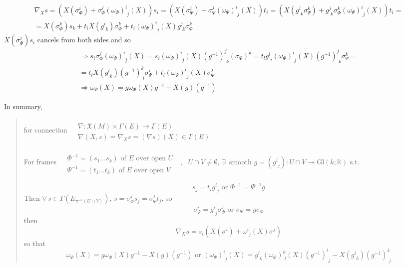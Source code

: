\documentclass[10pt]{amsart}
\begin{document}
\begin{multicols*}{2}
\[
\begin{gathered}
  \nabla_X s = (X(\sigma^i_{\Phi})+\sigma^j_{\Phi}(\omega_{\Phi})^i_{ \,\, j}(X) ) s_i = (X(\sigma^i_{\Psi}) + \sigma^j_{\Psi} (\omega_{\Psi})^i_{ \, \, j}(X) )t_i = (X(g^i_{ \,\, k} \sigma^k_{\Psi} ) + g^j_{ \,\,k} \sigma_{\Phi}^k (\omega_{\Psi})^i_{ \,\, j}(X))t_i = \\
  = X(\sigma^k_{\Phi})s_k + t_i X(g^i_{ \,\, k} ) \sigma^k_{\Phi} + t_i (\omega_{\Psi})^i_{ \,\, j}(X) g^j_{ \,\, k} \sigma^k_{\Phi} 
\end{gathered}
\]
$X(\sigma^j_{\Phi})s_i$ cancels from both sides and so
\[
\begin{gathered}
  \Longrightarrow s_i \sigma^j_{\Phi} (\omega_{\Phi})^i_{ \,\, j}(X) = s_i (\omega_{\Phi})^i_{ \,\, j}(X) (g^{-1})^j_{ \,\, k} (\sigma_{\Psi})^k = t_l g^l_{\,\, i} (\omega_{\Phi})^i_{ \,\, j}(X) (g^{-1})^j_{\,\,k} \sigma^k_{\Psi} = \\
  = t_l X(g^l_{ \,\, k})(g^{-1})^k_{ \,\, i} \sigma^i_{\Psi} + t_l (\omega_{\Psi})^l_{ \,\, j}(X) \sigma^j_{\Psi}  \\
  \Longrightarrow \omega_{\Psi}(X) = g\omega_{\Phi}(X)g^{-1} - X(g)(g^{-1})
\end{gathered}
\]

In summary, 
\begin{quote}
for connection $\begin{aligned} & \quad \\
  & \nabla : \mathfrak{X}(M) \times \Gamma(E) \to \Gamma(E) \\
  & \nabla(X,s) = \nabla_Xs = (\nabla s)(X) \in \Gamma(E) \end{aligned}$

For frames $\begin{aligned} & \quad \\
  & \Phi^{-1} = (s_1 \dots s_k) \text{ of $E$ over open $U$ } \\
  & \Psi^{-1} = (t_1 \dots t_k) \text{ of $E$ over open $V$ } 
\end{aligned}$, \, $U\cap V \neq \emptyset$, $\exists \, $ smooth $g = (g^i_{ \,\, j} ):U \cap V \to \text{Gl}(k;\mathbb{K})$ s.t. 

\[
s_j = t_i g^i_{ \,\, j} \text{ or } \Phi^{-1} = \Psi^{-1}g 
\]
Then $\forall \, s \in \Gamma(E_{\pi^{-1}(U\cap V) })$, $s = \sigma^j_{\Phi}s_j = \sigma^j_{\Psi} t_j$, so 
\[
\sigma^i_{\Psi} = g^i_{  \, \, j} \sigma^j_{\Phi} \text{ or } \sigma_{\Psi} = g\sigma_{\Phi}
\]
then
\[
\nabla_X s = s_i(X(\sigma^i) + \omega^i_{ \,\, j}(X)\sigma^j) 
\]
so that 
\begin{equation}
\boxed{ \omega_{\Psi}(X) = g\omega_{\Phi}(X)g^{-1} - X(g)(g^{-1}) \text{ or } (\omega_{\Psi})^i_{\, \, j}(X) = g^i_{ \,\, k} (\omega_{\Phi})^k_{ \,\, l }(X) (g^{-1})^l_{ \,\, j} - X(g^i_{ \,\, k})(g^{-1})^k_{ \,\, j} }
\end{equation}
\end{quote}





\end{multicols*}
\end{document}
